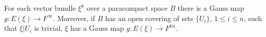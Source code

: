 For each vector bundle $\xi^k$ over a paracompact space $B$ there is a Gauss map $g: E(\xi) \to F^\infty$. Moreover, if $B$ has an open covering of sets $\{U_i\}$, $1 \leq i \leq n$, such that $\xi|U_i$ is trivial, $\xi$ has a Gauss map $g: E(\xi) \to F^{kn}$.

